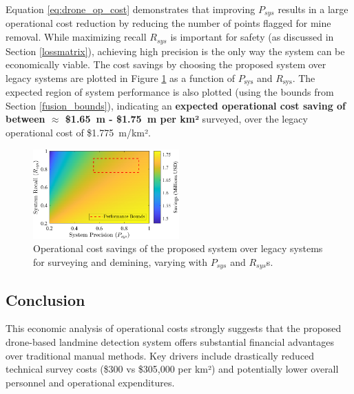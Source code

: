 Equation \ref{eq:drone_op_cost} demonstrates that improving $P_{sys}$ results in a large operational cost reduction by reducing the number of points flagged for mine removal. While maximizing recall $R_{sys}$ is important for safety (as discussed in Section \ref{lossmatrix}), achieving high precision is the only way the system can be economically viable. The cost savings by choosing the proposed system over legacy systems are plotted in Figure \ref{fig:financial_savings} as a function of $P_\text{sys}$ and $R_\text{sys}$. The expected region of system performance is also plotted (using the bounds from Section \ref{fusion_bounds}), indicating an \textbf{expected operational cost saving of between $\approx$ \$1.65~m - \$1.75~m per km²} surveyed, over the legacy operational cost of \$1.775~m/km². 


\begin{figure}[h!]
\centering
\includegraphics[width=0.5\textwidth]{figs/Rory/financial_savings.pdf} 
\caption{Operational cost savings of the proposed system over legacy systems for surveying and demining, varying with $P_{sys}$ and $R_{sys}$s.}
\label{fig:financial_savings}
\end{figure}


\subsection{Conclusion} \label{subsec:finance_conclusion}

This economic analysis of operational costs strongly suggests that the proposed drone-based landmine detection system offers substantial financial advantages over traditional manual methods. Key drivers include drastically reduced technical survey costs (\$300 vs \$305,000 per km²) and potentially lower overall personnel and operational expenditures.

